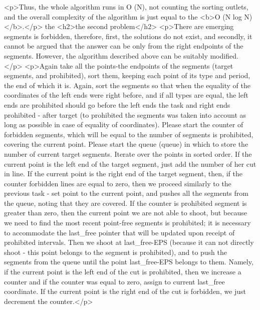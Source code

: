 <p>Thus, the whole algorithm runs in O (N), not counting the sorting outlets, and the overall complexity of the algorithm is just equal to the <b>O (N log N)</b>.</p>
the <h2>the second problem</h2>
<p>There are emerging segments is forbidden, therefore, first, the solutions do not exist, and secondly, it cannot be argued that the answer can be only from the right endpoints of the segments. However, the algorithm described above can be suitably modified.</p>
<p>Again take all the points-the endpoints of the segments (target segments, and prohibited), sort them, keeping each point of its type and period, the end of which it is. Again, sort the segments so that when the equality of the coordinates of the left ends were right before, and if all types are equal, the left ends are prohibited should go before the left ends the task and right ends prohibited - after target (to prohibited the segments was taken into account as long as possible in case of equality of coordinates). Please start the counter of forbidden segments, which will be equal to the number of segments is prohibited, covering the current point. Please start the queue (queue) in which to store the number of current target segments. Iterate over the points in sorted order. If the current point is the left end of the target segment, just add the number of her cut in line. If the current point is the right end of the target segment, then, if the counter forbidden lines are equal to zero, then we proceed similarly to the previous task - set point to the current point, and pushes all the segments from the queue, noting that they are covered. If the counter is prohibited segment is greater than zero, then the current point we are not able to shoot, but because we need to find the most recent point-free segments is prohibited; it is necessary to accommodate the last_free pointer that will be updated upon receipt of prohibited intervals. Then we shoot at last_free-EPS (because it can not directly shoot - this point belongs to the segment is prohibited), and to push the segments from the queue until the point last_free-EPS belongs to them. Namely, if the current point is the left end of the cut is prohibited, then we increase a counter and if the counter was equal to zero, assign to current last_free coordinate. If the current point is the right end of the cut is forbidden, we just decrement the counter.</p>